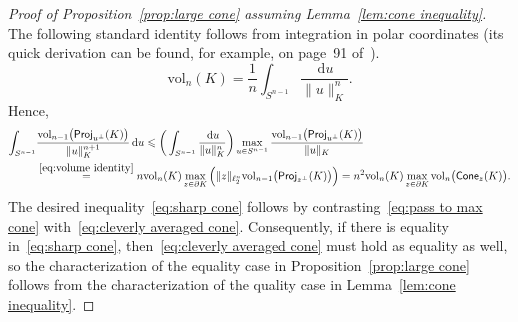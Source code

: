 \documentclass[11pt,reqno]{amsart}
\renewcommand{\le}{\leqslant}
\newcommand{\ud}[0]{\,\mathrm{d}}
\newcommand{\proj}{\mathsf{Proj}}
\theoremstyle{remark}
\newcommand{\vol}{\mathrm{vol}}
\renewcommand{\1}{\mathbf 1}
\newcommand{\cone}{\mathsf{Cone}}
\begin{document}
\begin{proof}[Proof of Proposition~\ref{prop:large cone} assuming Lemma~\ref{lem:cone inequality}] The following standard identity follows from integration in polar coordinates (its quick derivation can be found, for example, on page~91 of~\cite{Pis89}).
\begin{equation}\label{eq:volume identity}
\vol_n(K)=\frac{1}{n}\int_{S^{n-1}}\frac{\ud u}{\|u\|_K^n}.
\end{equation}
Hence,
\begin{align}\label{eq:pass to max cone}
\begin{split}
\int_{S^{n-1}} &\frac{\vol_{n-1}\big(\proj_{u^\perp}(K)\big)}{\|u\|_K^{n+1}}\ud u\le \bigg(\int_{S^{n-1}} \frac{\ud u}{\|u\|_K^n}\bigg)\max_{u\in S^{n-1}} \frac{\vol_{n-1}\big(\proj_{u^\perp}(K)\big)}{\|u\|_K}\\&\stackrel{\eqref{eq:volume identity}}{=} n\vol_n(K)\max_{z\in \partial K} \Big(\|z\|_{\ell_2^n} \vol_{n-1}\big(\proj_{z^\perp}(K)\big)\Big)=n^2 \vol_n(K)\max_{z\in \partial K} \vol_n\big(\cone_z(K)\big).
\end{split}
\end{align}
The desired inequality~\eqref{eq:sharp cone} follows by contrasting~\eqref{eq:pass to max cone} with~\eqref{eq:cleverly averaged cone}. Consequently, if there is equality in~\eqref{eq:sharp cone}, then~\eqref{eq:cleverly averaged cone} must hold as equality as well, so the characterization of the equality case in Proposition~\ref{prop:large cone} follows from the characterization of the quality case in Lemma~\ref{lem:cone inequality}.
\end{proof}
\end{document}
